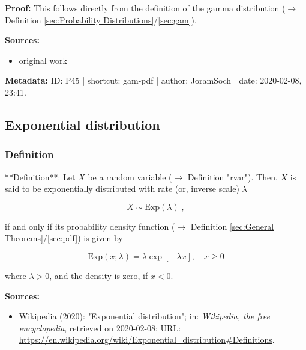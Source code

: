 \documentclass[a4paper,12pt]{book}
\begin{document}
\vspace{1em}
\textbf{Proof:} This follows directly from the definition of the gamma distribution ($\rightarrow$ Definition \ref{sec:Probability Distributions}/\ref{sec:gam}).

\vspace{1em}
\textbf{Sources:}
\begin{itemize}
\item original work\end{itemize}


\vspace{1em}
\textbf{Metadata:} ID: P45 | shortcut: gam-pdf | author: JoramSoch | date: 2020-02-08, 23:41.


\subsection{Exponential distribution}

\subsubsection[\textit{Definition}]{Definition} \label{sec:exp}

**Definition**: Let $X$ be a random variable ($\rightarrow$ Definition "rvar"). Then, $X$ is said to be exponentially distributed with rate (or, inverse scale) $\lambda$

\begin{equation} \label{eq:exp-exp}
X \sim \mathrm{Exp}(\lambda) \; ,
\end{equation}

if and only if its probability density function ($\rightarrow$ Definition \ref{sec:General Theorems}/\ref{sec:pdf}) is given by

\begin{equation} \label{eq:exp-exp-pdf}
\mathrm{Exp}(x; \lambda) = \lambda \exp[-\lambda x], \quad x \geq 0
\end{equation}

where $\lambda > 0$, and the density is zero, if $x < 0$.

\vspace{1em}
\textbf{Sources:}
\begin{itemize}
\item Wikipedia (2020): "Exponential distribution"; in: \textit{Wikipedia, the free encyclopedia}, retrieved on 2020-02-08; URL: \url{https://en.wikipedia.org/wiki/Exponential_distribution#Definitions}.
\end{itemize}
\end{document}
